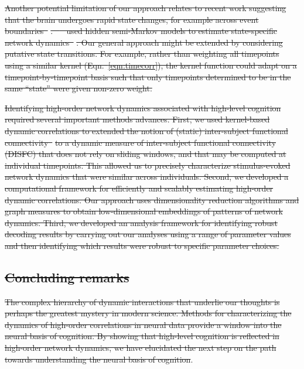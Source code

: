 \documentclass[english]{article}
\providecommand{\DIFdeltex}[1]{{\protect\color{red}\sout{#1}}}                      %
\providecommand{\DIFdelend}{} %
\providecommand{\DIFdel}[1]{\texorpdfstring{\DIFdeltex{#1}}{}} %
\DeclareRobustCommand{\DIFdelend}{\DIFOaddend \let\includegraphics\DIFOincludegraphics} %
\begin{document}
\DIFdel{Another potential limitation of our approach relates to recent work
suggesting that the brain undergoes rapid state changes, for example
across event boundaries~}%
\DIFdel{.
\mbox{%
\cite{ShapEtal19} }\hspace{0pt}%
used hidden semi-Markov models to estimate
state-specific network dynamics~}%
\DIFdel{.  Our
general approach might be extended by considering putative state
transitions. For example, rather than weighting all timepoints using a
similar kernel (Eqn.~\ref{eqn:timecorr}), the kernel function could
adapt on a timepoint-by-timepoint basis such that only timepoints
determined to be in the same ``state'' were given non-zero weight.
}%

\DIFdel{Identifying high-order network dynamics associated with high-level
cognition required several important methods advances.  First, we used
kernel-based dynamic correlations to extended the notion of (static)
inter-subject functional connectivity~}%
\DIFdel{to a dynamic
measure of inter-subject functional connectivity (DISFC) that does not
rely on sliding windows, and that may be computed at individual
timepoints.  This allowed us to precisely characterize stimulus-evoked
network dynamics that were similar across individuals.  Second, we
developed a computational framework for efficiently and scalably estimating
high-order dynamic correlations.  Our approach uses dimensionality
reduction algorithms and graph measures to obtain low-dimensional
embeddings of patterns of network dynamics.  Third, we developed an
analysis framework for identifying robust decoding results by carrying
out our analyses using a range of parameter values and then
identifying which results were robust to specific parameter choices.
}%

\subsection*{\DIFdel{Concluding remarks}}
\DIFdel{The complex hierarchy of dynamic interactions that underlie our
thoughts is perhaps the greatest mystery in modern science.  Methods
for characterizing the dynamics of high-order correlations in neural
data provide a window into the neural basis of cognition.  By showing
that high-level cognition is reflected in high-order network dynamics,
we have elucidated the next step on the path towards understanding the
neural basis of cognition}\DIFdelend .
\end{document}
